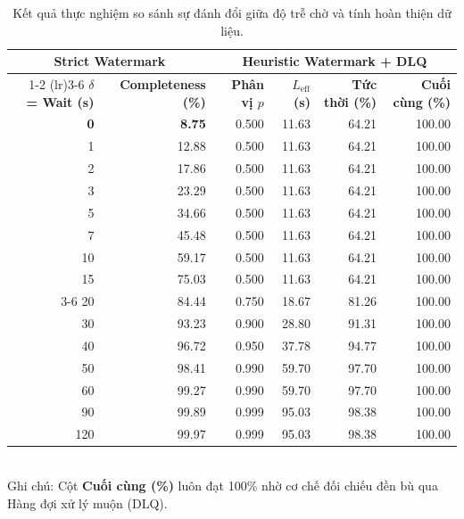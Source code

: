 \documentclass[12pt,a4paper]{article}
\begin{document}
\begin{table}[H]
    \centering
    \small
    \caption{Kết quả thực nghiệm so sánh sự đánh đổi giữa độ trễ chờ và tính hoàn thiện dữ liệu.}
    \label{tab:completeness_latency_tradeoff}
    \begin{tabular}{r r r r r r}
        \toprule
        \multicolumn{2}{c}{\textbf{Strict Watermark}} & \multicolumn{4}{c}{\textbf{Heuristic Watermark + DLQ}} \\
        \cmidrule(lr){1-2} \cmidrule(lr){3-6}
        \textbf{$\delta$ = Wait (s)}
          & \textbf{Completeness (\%)}
          & \textbf{Phân vị $p$}
          & \textbf{$L_{\text{eff}}$ (s)}
          & \textbf{Tức thời (\%)}
          & \textbf{Cuối cùng (\%)} \\
        \midrule
        \rowcolor{white}
        \textbf{0}
          & \textbf{8.75}
          & 0.500 & 11.63 & 64.21 & 100.00 \\
        1   & 12.88 & 0.500 & 11.63 & 64.21 & 100.00 \\
        2   & 17.86 & 0.500 & 11.63 & 64.21 & 100.00 \\
        3   & 23.29 & 0.500 & 11.63 & 64.21 & 100.00 \\
        5   & 34.66 & 0.500 & 11.63 & 64.21 & 100.00 \\
        7   & 45.48 & 0.500 & 11.63 & 64.21 & 100.00 \\
        10  & 59.17 & 0.500 & 11.63 & 64.21 & 100.00 \\
        15  & 75.03 & 0.500 & 11.63 & 64.21 & 100.00 \\
        \cmidrule{3-6}
        20  & 84.44 & 0.750 & 18.67 & 81.26 & 100.00 \\
        30  & 93.23 & 0.900 & 28.80 & 91.31 & 100.00 \\
        40  & 96.72 & 0.950 & 37.78 & 94.77 & 100.00 \\
        50  & 98.41 & 0.990 & 59.70 & 97.70 & 100.00 \\
        60  & 99.27 & 0.990 & 59.70 & 97.70 & 100.00 \\
        90  & 99.89 & 0.999 & 95.03 & 98.38 & 100.00 \\
        120 & 99.97 & 0.999 & 95.03 & 98.38 & 100.00 \\
        \bottomrule
    \end{tabular}
    \\[4pt]
    {\footnotesize Ghi chú: Cột \textbf{Cuối cùng (\%)} luôn đạt 100\% nhờ cơ chế đối chiếu đền bù qua Hàng đợi xử lý muộn (DLQ).}
\end{table}
\end{document}
